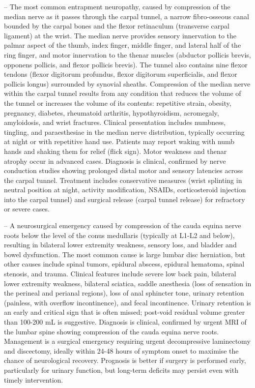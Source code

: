 -- The most common entrapment neuropathy, caused by compression of the median nerve as it passes through the carpal tunnel, a narrow fibro-osseous canal bounded by the carpal bones and the flexor retinaculum (transverse carpal ligament) at the wrist. The median nerve provides sensory innervation to the palmar aspect of the thumb, index finger, middle finger, and lateral half of the ring finger, and motor innervation to the thenar muscles (abductor pollicis brevis, opponens pollicis, and flexor pollicis brevis). The tunnel also contains nine flexor tendons (flexor digitorum profundus, flexor digitorum superficialis, and flexor pollicis longus) surrounded by synovial sheaths. Compression of the median nerve within the carpal tunnel results from any condition that reduces the volume of the tunnel or increases the volume of its contents: repetitive strain, obesity, pregnancy, diabetes, rheumatoid arthritis, hypothyroidism, acromegaly, amyloidosis, and wrist fractures. Clinical presentation includes numbness, tingling, and paraesthesiae in the median nerve distribution, typically occurring at night or with repetitive hand use. Patients may report waking with numb hands and shaking them for relief (flick sign). Motor weakness and thenar atrophy occur in advanced cases. Diagnosis is clinical, confirmed by nerve conduction studies showing prolonged distal motor and sensory latencies across the carpal tunnel. Treatment includes conservative measures (wrist splinting in neutral position at night, activity modification, NSAIDs, corticosteroid injection into the carpal tunnel) and surgical release (carpal tunnel release) for refractory or severe cases.

-- A neurosurgical emergency caused by compression of the cauda equina nerve roots below the level of the conus medullaris (typically at L1-L2 and below), resulting in bilateral lower extremity weakness, sensory loss, and bladder and bowel dysfunction. The most common cause is large lumbar disc herniation, but other causes include spinal tumors, epidural abscess, epidural hematoma, spinal stenosis, and trauma. Clinical features include severe low back pain, bilateral lower extremity weakness, bilateral sciatica, saddle anesthesia (loss of sensation in the perineal and perianal regions), loss of anal sphincter tone, urinary retention (painless, with overflow incontinence), and fecal incontinence. Urinary retention is an early and critical sign that is often missed; post-void residual volume greater than 100-200 mL is suggestive. Diagnosis is clinical, confirmed by urgent MRI of the lumbar spine showing compression of the cauda equina nerve roots. Management is a surgical emergency requiring urgent decompressive laminectomy and discectomy, ideally within 24-48 hours of symptom onset to maximise the chance of neurological recovery. Prognosis is better if surgery is performed early, particularly for urinary function, but long-term deficits may persist even with timely intervention.

